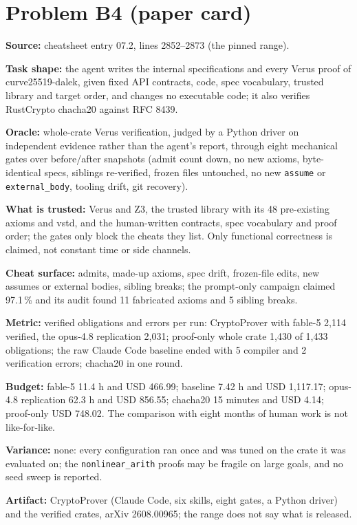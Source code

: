 \documentclass[11pt]{article}
\begin{document}
\section*{Problem B4 (paper card)}\label{ans:B4}
\begin{answer}
\textbf{Source:} cheatsheet entry 07.2, lines 2852--2873 (the pinned range).

\textbf{Task shape:} the agent writes the internal specifications and every
Verus proof of curve25519-dalek, given fixed API contracts, code, spec
vocabulary, trusted library and target order, and changes no executable code;
it also verifies RustCrypto chacha20 against RFC 8439.

\textbf{Oracle:} whole-crate Verus verification, judged by a Python driver on
independent evidence rather than the agent's report, through eight mechanical
gates over before/after snapshots (admit count down, no new axioms,
byte-identical specs, siblings re-verified, frozen files untouched, no new
\texttt{assume} or \texttt{external\_body}, tooling drift, git recovery).

\textbf{What is trusted:} Verus and Z3, the trusted library with its 48
pre-existing axioms and vstd, and the human-written contracts, spec vocabulary
and proof order; the gates only block the cheats they list. Only functional
correctness is claimed, not constant time or side channels.

\textbf{Cheat surface:} admits, made-up axioms, spec drift, frozen-file edits,
new assumes or external bodies, sibling breaks; the prompt-only campaign
claimed 97.1\,\% and its audit found 11 fabricated axioms and 5 sibling breaks.

\textbf{Metric:} verified obligations and errors per run: CryptoProver with
fable-5 2,114 verified, the opus-4.8 replication 2,031; proof-only whole crate
1,430 of 1,433 obligations; the raw Claude Code baseline ended with 5 compiler
and 2 verification errors; chacha20 in one round.

\textbf{Budget:} fable-5 11.4 h and USD 466.99; baseline 7.42 h and USD
1,117.17; opus-4.8 replication 62.3 h and USD 856.55; chacha20 15 minutes and
USD 4.14; proof-only USD 748.02. The comparison with eight months of human work
is not like-for-like.

\textbf{Variance:} none: every configuration ran once and was tuned on the
crate it was evaluated on; the \texttt{nonlinear\_arith} proofs may be fragile on
large goals, and no seed sweep is reported.

\textbf{Artifact:} CryptoProver (Claude Code, six skills, eight gates, a Python
driver) and the verified crates, arXiv 2608.00965; the range does not say what
is released.
\end{answer}
\end{document}
